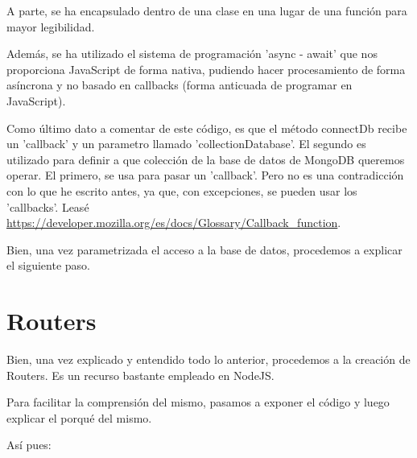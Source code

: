 \documentclass{article}
\begin{document}
A parte, se ha encapsulado dentro de una clase en una lugar de una función para mayor legibilidad.

Además, se ha utilizado el sistema de programación 'async - await' que nos proporciona JavaScript de forma nativa, pudiendo hacer procesamiento de forma asíncrona y no basado en callbacks (forma anticuada de programar en JavaScript).

Como último dato a comentar de este código, es que el método connectDb recibe un 'callback' y un parametro llamado 'collectionDatabase'. El segundo es utilizado para definir a que colección de la base de datos de MongoDB queremos operar. El primero, se usa para pasar un 'callback'. Pero no es una contradicción con lo que he escrito antes, ya que, con excepciones, se pueden usar los 'callbacks'. Leasé \url{https://developer.mozilla.org/es/docs/Glossary/Callback_function}.

Bien, una vez parametrizada el acceso a la base de datos, procedemos a explicar el siguiente paso.

\section{Routers}
Bien, una vez explicado y entendido todo lo anterior, procedemos a la creación de Routers. Es un recurso bastante empleado en NodeJS.

Para facilitar la comprensión del mismo, pasamos a exponer el código y luego explicar el porqué del mismo.

Así pues:
\end{document}

